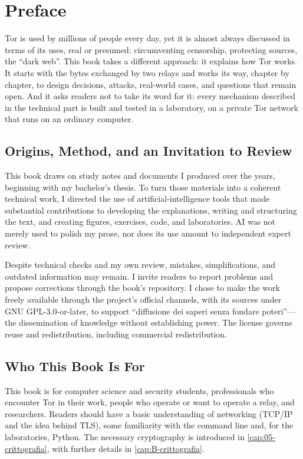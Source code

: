 \chapter{Preface}

Tor is used by millions of people every day, yet it is almost always discussed in terms of its uses, real or presumed: circumventing censorship, protecting sources, the \enquote{dark web}. This book takes a different approach: it explains how Tor works. It starts with the bytes exchanged by two relays and works its way, chapter by chapter, to design decisions, attacks, real-world cases, and questions that remain open. And it asks readers not to take its word for it: every mechanism described in the technical part is built and tested in a laboratory, on a private Tor network that runs on an ordinary computer.

\section*{Origins, Method, and an Invitation to Review}

This book draws on study notes and documents I produced over the years, beginning with my bachelor's thesis. To turn those materials into a coherent technical work, I directed the use of artificial-intelligence tools that made substantial contributions to developing the explanations, writing and structuring the text, and creating figures, exercises, code, and laboratories. AI was not merely used to polish my prose, nor does its use amount to independent expert review.

Despite technical checks and my own review, mistakes, simplifications, and outdated information may remain. I invite readers to report problems and propose corrections through the book's repository. I chose to make the work freely available through the project's official channels, with its sources under GNU GPL-3.0-or-later, to support \enquote{diffusione dei saperi senza fondare poteri}---the dissemination of knowledge without establishing power. The license governs reuse and redistribution, including commercial redistribution.

\section*{Who This Book Is For}

This book is for computer science and security students, professionals who encounter Tor in their work, people who operate or want to operate a relay, and researchers. Readers should have a basic understanding of networking (TCP/IP and the idea behind TLS), some familiarity with the command line and, for the laboratories, Python. The necessary cryptography is introduced in \cref{cap:05-crittografia}, with further details in \cref{cap:B-crittografia}.

